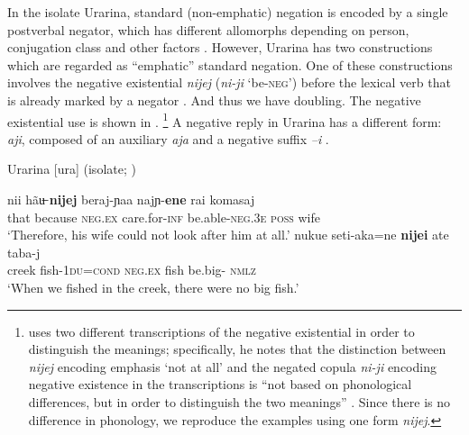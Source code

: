 ﻿\documentclass[output=paper,draft,draftmode,colorlinks,citecolor=brown]{langscibook}
\begin{document}
In the isolate Urarina, standard (non-emphatic) negation is encoded by a
single postverbal negator, which has different allomorphs depending on
person, conjugation class and other factors \citep[484]{Olawsky2006}.
However, Urarina has two constructions which are regarded as ``emphatic''
standard negation. One of these constructions involves the negative
existential \textit{nijej} (\textit{ni-ji} `be-\textsc{neg}') before the
lexical verb that is already marked by a negator . And thus
we have doubling. The negative existential use is shown in
.%
%
\footnote{\textcite{Olawsky2006} uses two different
transcriptions of the negative existential in order to distinguish the
meanings; specifically, he notes that the distinction between
\textit{nijej} encoding emphasis `not at all' and the negated copula
\textit{ni-ji} encoding negative existence in the transcriptions is ``not
based on phonological differences, but in order to distinguish the two
meanings'' \parencite[555, footnote 65]{Olawsky2006}. Since there is no
difference in phonology, we reproduce the examples using one form
\textit{nijej}.} %
%
A negative reply in Urarina has a different form:
\textit{aji}, composed of an auxiliary \textit{aja} and a negative suffix
\textit{–i} \parencite[400]{Olawsky2006}. 
%
\begin{exe}\ex\label{ex:int-urarina-wife-fish}
Urarina [ura] (isolate; \citealt[554, 556]{Olawsky2006})
    \begin{xlist}
    \ex\label{ex:int-urarina-wife}
    \gll nii hãu̶ \textbf{nijej} beraj-ɲaa najɲ-\textbf{ene}    
    rai      komasaj \\
    that because \textsc{neg.ex} care.for-\textsc{inf}
    be.able-\textsc{neg.3e} \textsc{poss}   wife\\
    \glt `Therefore, his wife could not look after him at all.'
    \ex\label{ex:int-urarina-fish}
    \gll nukue  seti-aka=ne    \textbf{nijei}  ate  taba-j \\
    creek   fish-\textsc{1du=cond}       \textsc{neg.ex}  fish   
    be.big- \textsc{nmlz}\\
    \glt `When we fished in the creek, there were no big fish.'
    \end{xlist}\end{exe}
\end{document}

